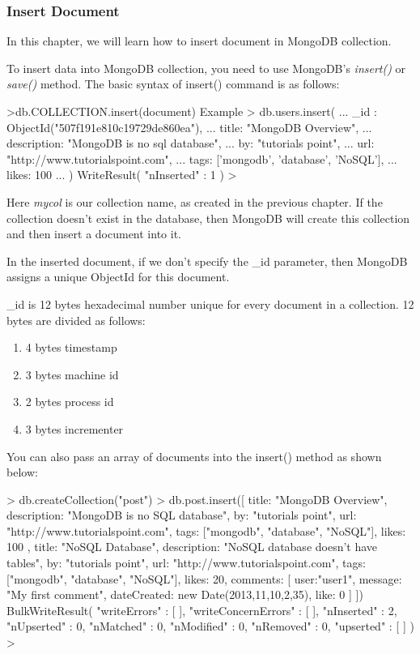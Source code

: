 \documentclass[12pt]{article}
\begin{document}
\subsubsection{Insert Document}

In this chapter, we will learn how to insert document in MongoDB collection.

To insert data into MongoDB collection, you need to use MongoDB's
\emph{insert()} or \emph{save()} method. The basic syntax of insert()
command is as follows:

\begin{bashcode}
>db.COLLECTION.insert(document)
Example
> db.users.insert({
... _id : ObjectId("507f191e810c19729de860ea"),
... title: "MongoDB Overview",
... description: "MongoDB is no sql database",
... by: "tutorials point",
... url: "http://www.tutorialspoint.com",
... tags: ['mongodb', 'database', 'NoSQL'],
... likes: 100
... })
WriteResult({ "nInserted" : 1 })
>
\end{bashcode}

Here \emph{mycol} is our collection name, as created in the previous
chapter. If the collection doesn't exist in the database, then MongoDB
will create this collection and then insert a document into it.

In the inserted document, if we don't specify the \_id parameter, then
MongoDB assigns a unique ObjectId for this document.

\_id is 12 bytes hexadecimal number unique for every document in a
collection. 12 bytes are divided as follows:

\begin{enumerate}
  \item 4 bytes timestamp
  \item 3 bytes machine id
  \item 2 bytes process id
  \item 3 bytes incrementer
\end{enumerate}

You can also pass an array of documents into the insert() method as
shown below:

\begin{bashcode}
> db.createCollection("post")
> db.post.insert([
    {
        title: "MongoDB Overview",
        description: "MongoDB is no SQL database",
        by: "tutorials point",
        url: "http://www.tutorialspoint.com",
        tags: ["mongodb", "database", "NoSQL"],
        likes: 100
    },
    {
    title: "NoSQL Database",
    description: "NoSQL database doesn't have tables",
    by: "tutorials point",
    url: "http://www.tutorialspoint.com",
    tags: ["mongodb", "database", "NoSQL"],
    likes: 20,
    comments: [
        {
            user:"user1",
            message: "My first comment",
            dateCreated: new Date(2013,11,10,2,35),
            like: 0
        }
    ]
}
])
BulkWriteResult({
    "writeErrors" : [ ],
    "writeConcernErrors" : [ ],
    "nInserted" : 2,
    "nUpserted" : 0,
    "nMatched" : 0,
    "nModified" : 0,
    "nRemoved" : 0,
    "upserted" : [ ]
})
>
\end{bashcode}
\end{document}
